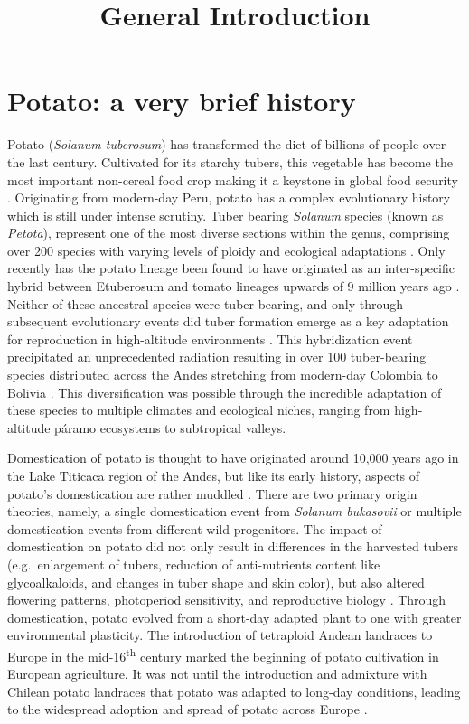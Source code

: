 \documentclass[
]{article}
\title{General Introduction}
\author{}
\date{}
\begin{document}
\maketitle


\section{Potato: a very brief
history}\label{potato-a-very-brief-history}

Potato (\emph{Solanum tuberosum}) has transformed the diet of billions
of people over the last century. Cultivated for its starchy tubers, this
vegetable has become the most important non-cereal food crop making it a
keystone in global food security \autocite{Zaheer2016}. Originating from
modern-day Peru, potato has a complex evolutionary history which is
still under intense scrutiny. Tuber bearing \emph{Solanum} species
(known as \emph{Petota}), represent one of the most diverse sections
within the genus, comprising over 200 species with varying levels of
ploidy and ecological adaptations \autocite{Spooner2014}. Only recently
has the potato lineage been found to have originated as an
inter-specific hybrid between Etuberosum and tomato lineages upwards of
9 million years ago \autocite{Zhang2025}. Neither of these ancestral
species were tuber-bearing, and only through subsequent evolutionary
events did tuber formation emerge as a key adaptation for reproduction
in high-altitude environments \autocite{Hardigan2017}. This
hybridization event precipitated an unprecedented radiation resulting in
over 100 tuber-bearing species distributed across the Andes stretching
from modern-day Colombia to Bolivia \autocite{Spooner2014}. This
diversification was possible through the incredible adaptation of these
species to multiple climates and ecological niches, ranging from
high-altitude páramo ecosystems to subtropical valleys.

Domestication of potato is thought to have originated around 10,000
years ago in the Lake Titicaca region of the Andes, but like its early
history, aspects of potato's domestication are rather muddled
\autocite{Spooner2005}. There are two primary origin theories, namely, a
single domestication event from \emph{Solanum bukasovii} or multiple
domestication events from different wild progenitors. The impact of
domestication on potato did not only result in differences in the
harvested tubers (e.g.~enlargement of tubers, reduction of
anti-nutrients content like glycoalkaloids, and changes in tuber shape
and skin color), but also altered flowering patterns, photoperiod
sensitivity, and reproductive biology \autocite{Hardigan2017}. Through
domestication, potato evolved from a short-day adapted plant to one with
greater environmental plasticity. The introduction of tetraploid Andean
landraces to Europe in the mid-16\textsuperscript{th} century marked the
beginning of potato cultivation in European agriculture. It was not
until the introduction and admixture with Chilean potato landraces that
potato was adapted to long-day conditions, leading to the widespread
adoption and spread of potato across Europe
\autocite{DeJong2016,Gutaker2019}.
\end{document}
